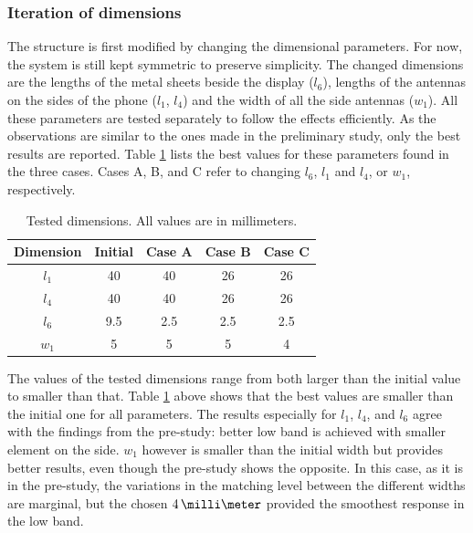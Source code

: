 \subsubsection{Iteration of dimensions}
\label{sec:dimension iteration}
The structure is first modified by changing the dimensional parameters. For now, the system is still kept symmetric to preserve simplicity. The changed dimensions are the lengths of the metal sheets beside the display ($l_6$), lengths of the antennas on the sides of the phone ($l_1$, $l_4$) and the width of all the side antennas ($w_1$). All these parameters are tested separately to follow the effects efficiently. As the observations are similar to the ones made in the preliminary study, only the best results are reported. Table \ref{tab:concept2} lists the best values for these parameters found in the three cases. Cases A, B, and C refer to changing $l_6$, $l_1$ and $l_4$, or $w_1$, respectively. 
\begin{table}[H]
    \centering
    \caption{Tested dimensions. All values are in millimeters.}
    \label{tab:concept2}
    \begin{tabular}{|c|c|c|c|c|}
        \hline
        \textbf{Dimension} & \textbf{Initial} & \textbf{Case A} & \textbf{Case B} & \textbf{Case C}\\
        \hline
        $l_1$ & 40 & 40 & 26 & 26\\
        \hline
        $l_4$ & 40 & 40 & 26 & 26\\
        \hline
        $l_6$ & 9.5 & 2.5 & 2.5 & 2.5\\
        \hline
        $w_1$ & 5 & 5 & 5 & 4\\
        \hline
    \end{tabular}
\end{table}

The values of the tested dimensions range from both larger than the initial value to smaller than that. Table \ref{tab:concept2} above shows that the best values are smaller than the initial one for all parameters. The results especially for $l_1$, $l_4$, and $l_6$ agree with the findings from the pre-study: better low band is achieved with smaller element on the side. $w_1$ however is smaller than the initial width but provides better results, even though the pre-study shows the opposite. In this case, as it is in the pre-study, the variations in the matching level between the different widths are marginal, but the chosen $4\,\milli\meter$ provided the smoothest response in the low band.

